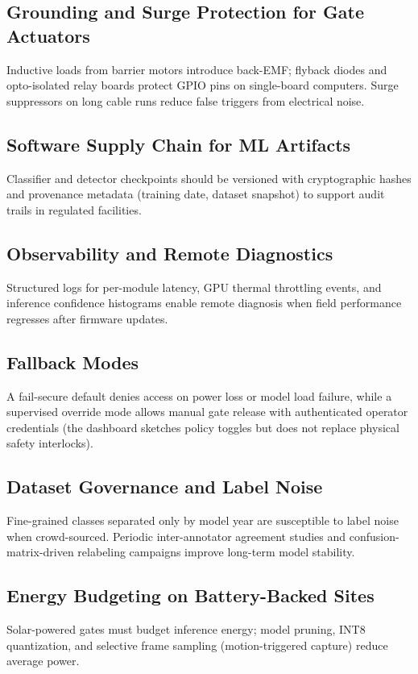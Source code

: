 \subsection{Grounding and Surge Protection for Gate Actuators}
Inductive loads from barrier motors introduce back-EMF; flyback diodes and opto-isolated relay boards protect GPIO pins on single-board computers. Surge suppressors on long cable runs reduce false triggers from electrical noise.

\subsection{Software Supply Chain for ML Artifacts}
Classifier and detector checkpoints should be versioned with cryptographic hashes and provenance metadata (training date, dataset snapshot) to support audit trails in regulated facilities.

\subsection{Observability and Remote Diagnostics}
Structured logs for per-module latency, GPU thermal throttling events, and inference confidence histograms enable remote diagnosis when field performance regresses after firmware updates.

\subsection{Fallback Modes}
A fail-secure default denies access on power loss or model load failure, while a supervised override mode allows manual gate release with authenticated operator credentials (the dashboard sketches policy toggles but does not replace physical safety interlocks).

\subsection{Dataset Governance and Label Noise}
Fine-grained classes separated only by model year are susceptible to label noise when crowd-sourced. Periodic inter-annotator agreement studies and confusion-matrix-driven relabeling campaigns improve long-term model stability.

\subsection{Energy Budgeting on Battery-Backed Sites}
Solar-powered gates must budget inference energy; model pruning, INT8 quantization, and selective frame sampling (motion-triggered capture) reduce average power.

